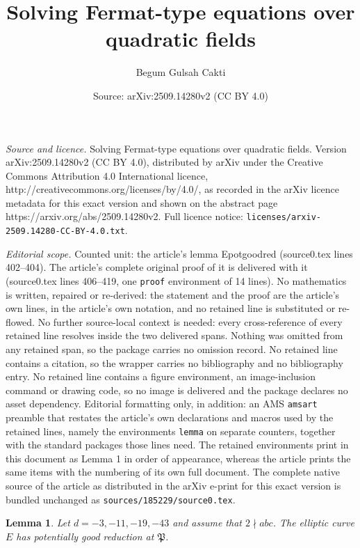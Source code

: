 \documentclass[10pt,a4paper]{amsart}
\title{Solving Fermat-type equations over quadratic fields}
\author{Begum Gulsah Cakti}
\date{Source: arXiv:2509.14280v2 (CC BY 4.0)}
\newtheorem{lemma}{Lemma}
\newcommand {\mfp}{{\mathfrak{P}}}
\begin{document}
\maketitle

\noindent\emph{Source and licence.} Solving Fermat-type equations over quadratic fields. Version arXiv:2509.14280v2 (CC BY 4.0), distributed by arXiv under the Creative Commons Attribution 4.0 International licence, http://creativecommons.org/licenses/by/4.0/, as recorded in the arXiv licence metadata for this exact version and shown on the abstract page https://arxiv.org/abs/2509.14280v2. Full licence notice: \texttt{licenses/arxiv-2509.14280-CC-BY-4.0.txt}.\par\smallskip

\noindent\textit{Editorial scope.} Counted unit: the article's lemma Epotgoodred (source0.tex lines 402--404). The article's complete original proof of it is delivered with it (source0.tex lines 406--419, one \texttt{proof} environment of 14 lines). No mathematics is written, repaired or re-derived: the statement and the proof are the article's own lines, in the article's own notation, and no retained line is substituted or re-flowed.  No further source-local context is needed: every cross-reference of every retained line resolves inside the two delivered spans.  Nothing was omitted from any retained span, so the package carries no omission record.  No retained line contains a citation, so the wrapper carries no bibliography and no bibliography entry.  No retained line contains a figure environment, an image-inclusion command or drawing code, so no image is delivered and the package declares no asset dependency.  Editorial formatting only, in addition: an AMS \texttt{amsart} preamble that restates the article's own declarations and macros used by the retained lines, namely the environments \texttt{lemma} on separate counters, together with the standard packages those lines need.  The retained environments print in this document as Lemma 1 in order of appearance, whereas the article prints the same items with the numbering of its own full document.  The complete native source of the article as distributed in the arXiv e-print for this exact version is bundled unchanged as \texttt{sources/185229/source0.tex}.
\begin{lemma}\label{lemma: Epotgoodred}
    Let $d=-3,-11,-19,-43$ and assume that $2\nmid abc$. The elliptic curve $E$ has potentially good reduction at $\mfp$.
\end{lemma}
\end{document}
